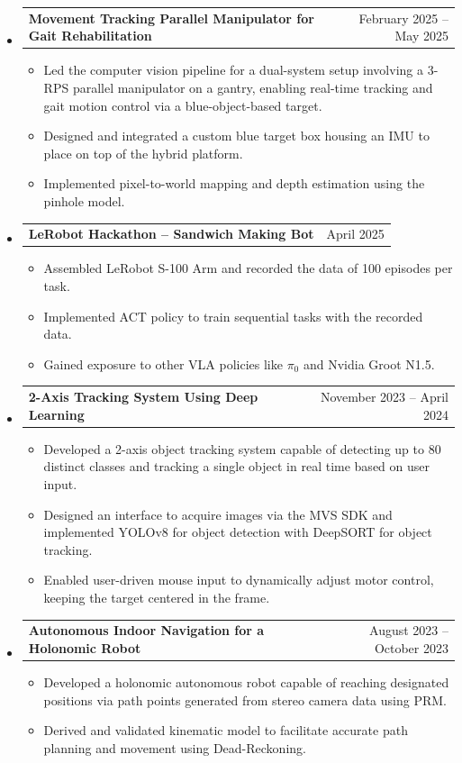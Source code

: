 \documentclass[a4paper,10pt]{article}
\makeatletter
\newcommand{\resumeItem}[1]{
  \item\small{
    {#1 \vspace{-2pt}}
  }
}
\newcommand{\resumeProjectHeading}[2]{
    \item
    \begin{tabular*}{0.97\textwidth}{l@{\extracolsep{\fill}}r}
      \small#1 & #2 \\
    \end{tabular*}\vspace{-5pt}
}
\makeatother
\begin{document}
\begin{itemize}[leftmargin=0.15in, label={}]
      
    \resumeProjectHeading
      {\textbf{Movement Tracking Parallel Manipulator for Gait Rehabilitation}}{February 2025 -- May 2025}
      \begin{itemize}
        \resumeItem{Led the computer vision pipeline for a dual-system setup involving a 3-RPS parallel manipulator on a gantry, enabling real-time tracking and gait motion control via a blue-object-based target.}
        \resumeItem{Designed and integrated a custom blue target box housing an IMU to place on top of the hybrid platform.}
        \resumeItem{Implemented pixel-to-world mapping and depth estimation using the pinhole model.}
      \end{itemize}

    \resumeProjectHeading
      {\textbf{LeRobot Hackathon -- Sandwich Making Bot}}{April 2025}
      \begin{itemize}
        \resumeItem{Assembled LeRobot S-100 Arm and recorded the data of 100 episodes per task.}
        \resumeItem{Implemented ACT policy to train sequential tasks with the recorded data.}
        \resumeItem{Gained exposure to other VLA policies like $\pi_0$ and Nvidia Groot N1.5.}
      \end{itemize}

    \resumeProjectHeading
      {\textbf{2-Axis Tracking System Using Deep Learning}}{November 2023 -- April 2024}
      \begin{itemize}
        \resumeItem{Developed a 2-axis object tracking system capable of detecting up to 80 distinct classes and tracking a single object in real time based on user input.}
        \resumeItem{Designed an interface to acquire images via the MVS SDK and implemented YOLOv8 for object detection with DeepSORT for object tracking.}
        \resumeItem{Enabled user-driven mouse input to dynamically adjust motor control, keeping the target centered in the frame.}
      \end{itemize}

    \resumeProjectHeading
      {\textbf{Autonomous Indoor Navigation for a Holonomic Robot}}{August 2023 -- October 2023}
      \begin{itemize}
        \resumeItem{Developed a holonomic autonomous robot capable of reaching designated positions via path points generated from stereo camera data using PRM.}
        \resumeItem{Derived and validated kinematic model to facilitate accurate path planning and movement using Dead-Reckoning.}
      \end{itemize}
      
  \end{itemize}
\end{document}
